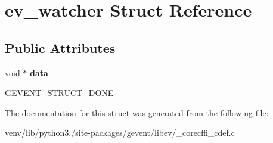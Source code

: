 \hypertarget{structev__watcher}{}\section{ev\+\_\+watcher Struct Reference}
\label{structev__watcher}
\subsection*{Public Attributes}
\begin{DoxyCompactItemize}
\item 
\mbox{\label{structev__watcher_a2b050ca7a7bbb9ab59a3839b004ed312}} 
void $\ast$ {\bfseries data}
\item 
\mbox{\label{structev__watcher_a178ba404f799ccb6f6994a3d64250d2d}} 
G\+E\+V\+E\+N\+T\+\_\+\+S\+T\+R\+U\+C\+T\+\_\+\+D\+O\+NE {\bfseries \+\_\+}
\end{DoxyCompactItemize}


The documentation for this struct was generated from the following file\+:\begin{DoxyCompactItemize}
\item 
venv/lib/python3./site-\/packages/gevent/libev/\+\_\+corecffi\+\_\+cdef.\+c\end{DoxyCompactItemize}
